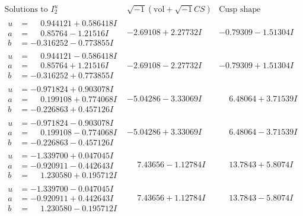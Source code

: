 \documentclass[1p]{elsarticle_modified}
\theoremstyle{definition}
\newcommand{\I}{\sqrt{-1}}
\begin{document}
$$\begin{array}{c|c|c}  
\text{Solutions to }I^u_{2}& \I (\text{vol} + \sqrt{-1}CS) & \text{Cusp shape}\\
 \hline 
\begin{aligned}
u &= \phantom{-}0.944121 + 0.586418 I \\
a &= \phantom{-}0.85764 - 1.21516 I \\
b &= -0.316252 - 0.773855 I\end{aligned}
 & -2.69108 + 2.27732 I & -0.79309 - 1.51304 I \\ \hline\begin{aligned}
u &= \phantom{-}0.944121 - 0.586418 I \\
a &= \phantom{-}0.85764 + 1.21516 I \\
b &= -0.316252 + 0.773855 I\end{aligned}
 & -2.69108 - 2.27732 I & -0.79309 + 1.51304 I \\ \hline\begin{aligned}
u &= -0.971824 + 0.903078 I \\
a &= \phantom{-}0.199108 + 0.774068 I \\
b &= -0.226863 + 0.457126 I\end{aligned}
 & -5.04286 - 3.33069 I & \phantom{-}6.48064 + 3.71539 I \\ \hline\begin{aligned}
u &= -0.971824 - 0.903078 I \\
a &= \phantom{-}0.199108 - 0.774068 I \\
b &= -0.226863 - 0.457126 I\end{aligned}
 & -5.04286 + 3.33069 I & \phantom{-}6.48064 - 3.71539 I \\ \hline\begin{aligned}
u &= -1.339700 + 0.047045 I \\
a &= -0.920911 - 0.442643 I \\
b &= \phantom{-}1.230580 + 0.195712 I\end{aligned}
 & \phantom{-}7.43656 - 1.12784 I & \phantom{-}13.7843 + 5.8074 I \\ \hline\begin{aligned}
u &= -1.339700 - 0.047045 I \\
a &= -0.920911 + 0.442643 I \\
b &= \phantom{-}1.230580 - 0.195712 I\end{aligned}
 & \phantom{-}7.43656 + 1.12784 I & \phantom{-}13.7843 - 5.8074 I \\ \hline\begin{aligned}

\end{aligned}
\end{array}$$
\end{document}
